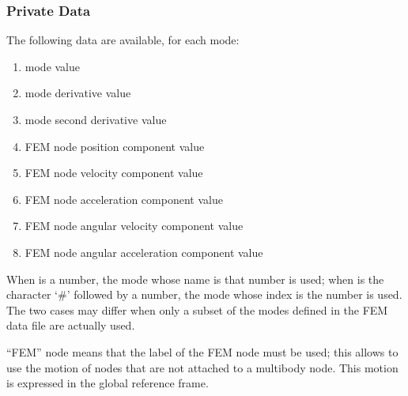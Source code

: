 \subsubsection{Private Data}
The following data are available, for each mode:
\begin{enumerate}
\item {} mode  value
\item {} mode  derivative value
\item {} mode  second derivative value
\item {} FEM node  position  component value
\item {} FEM node  velocity  component value
\item {} FEM node  acceleration  component value
\item {} FEM node  angular velocity  component value
\item {} FEM node  angular acceleration  component value
\end{enumerate}
When  is a number, the mode whose name is that number is used;
when  is the character `\#' followed by a number,
the mode whose index is the number is used.
The two cases may differ when only a subset of the modes defined
in the FEM data file are actually used.

``FEM'' node means that the label of the FEM node must be used;
this allows to use the motion of nodes that are not attached
to a multibody node.
This motion is expressed in the global reference frame.




